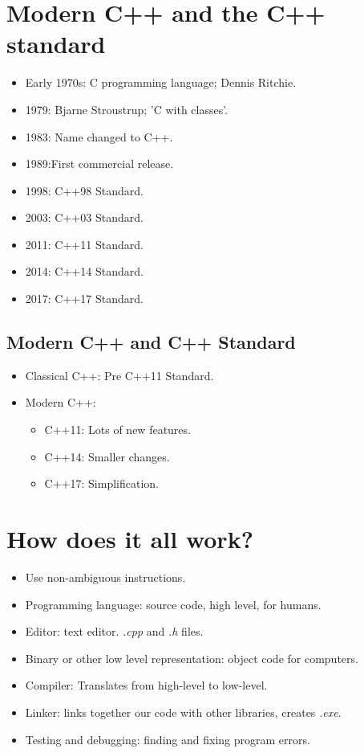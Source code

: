 \section{Modern C++ and the C++ standard}
\begin{multicols}{2}
    \begin{itemize}
        \item Early 1970s: C programming language; Dennis Ritchie.
        \item 1979: Bjarne Stroustrup; 'C with classes'.
        \item 1983: Name changed to C++.
        \item 1989:First commercial release. 
        \item 1998: C++98 Standard.
        \item 2003: C++03 Standard. 
        \item 2011: C++11 Standard. 
        \item 2014: C++14 Standard. 
        \item 2017: C++17 Standard. 
    \end{itemize}
\end{multicols}

\subsection{Modern C++ and C++ Standard}
\begin{itemize}
    \item Classical C++: Pre C++11 Standard. 
    \item Modern C++: 
        \begin{itemize}
            \item C++11: Lots of new features. 
            \item C++14: Smaller changes. 
            \item C++17: Simplification. 
        \end{itemize}
\end{itemize}


\section{How does it all work?}
\begin{itemize}
    \item Use non-ambiguous instructions. 
    \item Programming language: source code, high level, for humans.
    \item Editor: text editor. \emph{.cpp} and \emph{.h} files.
    \item Binary or other low level representation: object code for computers. 
    \item Compiler: Translates from high-level to low-level. 
    \item Linker: links together our code with other libraries, creates \emph{.exe}.
    \item Testing and debugging: finding and fixing program errors.
\end{itemize}

